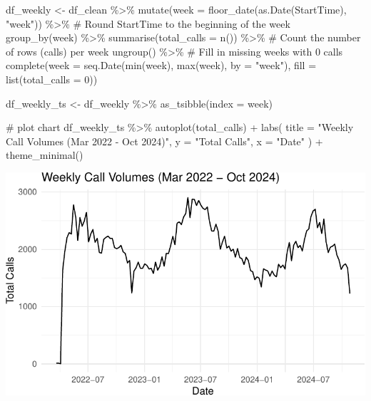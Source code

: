 \documentclass[
  letterpaper,
  DIV=11,
  numbers=noendperiod]{scrartcl}
\newenvironment{Shaded}{\begin{snugshade}}{\end{snugshade}}
\newcommand{\AttributeTok}[1]{\textcolor[rgb]{0.40,0.45,0.13}{#1}}
\newcommand{\CommentTok}[1]{\textcolor[rgb]{0.37,0.37,0.37}{#1}}
\newcommand{\DecValTok}[1]{\textcolor[rgb]{0.68,0.00,0.00}{#1}}
\newcommand{\FunctionTok}[1]{\textcolor[rgb]{0.28,0.35,0.67}{#1}}
\newcommand{\NormalTok}[1]{\textcolor[rgb]{0.00,0.23,0.31}{#1}}
\newcommand{\OtherTok}[1]{\textcolor[rgb]{0.00,0.23,0.31}{#1}}
\newcommand{\SpecialCharTok}[1]{\textcolor[rgb]{0.37,0.37,0.37}{#1}}
\newcommand{\StringTok}[1]{\textcolor[rgb]{0.13,0.47,0.30}{#1}}
\begin{document}
\begin{Shaded}
\begin{Highlighting}[]
\NormalTok{df\_weekly }\OtherTok{\textless{}{-}}\NormalTok{ df\_clean }\SpecialCharTok{\%\textgreater{}\%}
  \FunctionTok{mutate}\NormalTok{(}\AttributeTok{week =} \FunctionTok{floor\_date}\NormalTok{(}\FunctionTok{as.Date}\NormalTok{(StartTime), }\StringTok{"week"}\NormalTok{)) }\SpecialCharTok{\%\textgreater{}\%}  \CommentTok{\# Round StartTime to the beginning of the week}
  \FunctionTok{group\_by}\NormalTok{(week) }\SpecialCharTok{\%\textgreater{}\%}
  \FunctionTok{summarise}\NormalTok{(}\AttributeTok{total\_calls =} \FunctionTok{n}\NormalTok{()) }\SpecialCharTok{\%\textgreater{}\%}  \CommentTok{\# Count the number of rows (calls) per week}
  \FunctionTok{ungroup}\NormalTok{() }\SpecialCharTok{\%\textgreater{}\%}
  \CommentTok{\# Fill in missing weeks with 0 calls}
  \FunctionTok{complete}\NormalTok{(}\AttributeTok{week =} \FunctionTok{seq.Date}\NormalTok{(}\FunctionTok{min}\NormalTok{(week), }\FunctionTok{max}\NormalTok{(week), }\AttributeTok{by =} \StringTok{"week"}\NormalTok{), }\AttributeTok{fill =} \FunctionTok{list}\NormalTok{(}\AttributeTok{total\_calls =} \DecValTok{0}\NormalTok{))  }

\NormalTok{df\_weekly\_ts }\OtherTok{\textless{}{-}}\NormalTok{ df\_weekly }\SpecialCharTok{\%\textgreater{}\%}
  \FunctionTok{as\_tsibble}\NormalTok{(}\AttributeTok{index =}\NormalTok{ week)}

\CommentTok{\# plot chart}
\NormalTok{df\_weekly\_ts }\SpecialCharTok{\%\textgreater{}\%}
  \FunctionTok{autoplot}\NormalTok{(total\_calls) }\SpecialCharTok{+}
  \FunctionTok{labs}\NormalTok{(}
    \AttributeTok{title =} \StringTok{"Weekly Call Volumes (Mar 2022 {-} Oct 2024)"}\NormalTok{,}
    \AttributeTok{y =} \StringTok{"Total Calls"}\NormalTok{,}
    \AttributeTok{x =} \StringTok{"Date"}
\NormalTok{  ) }\SpecialCharTok{+} 
  \FunctionTok{theme\_minimal}\NormalTok{()}
\end{Highlighting}
\end{Shaded}

\includegraphics{final_proj_group1_files/figure-pdf/weekly-1.pdf}
\end{document}
